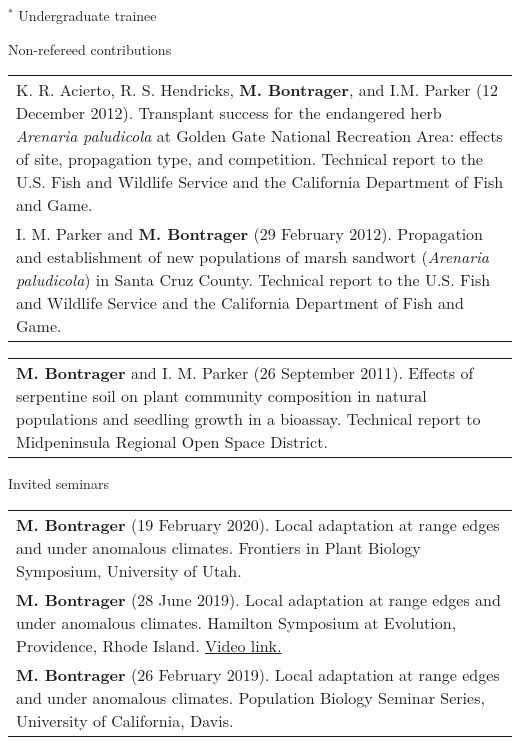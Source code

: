 \documentclass[letterpaper,11pt,oneside]{article}
\begin{document}
\smallskip
\noindent $^{*}$ Undergraduate trainee

\bigskip
\bigskip




\noindent\Large{Non-refereed contributions}  
\normalsize
\bigskip

\def\arraystretch{1.2}
\noindent \begin{tabular}{@{} >{\raggedright\arraybackslash}p{16.11cm}}
K. R. Acierto, R. S. Hendricks, \textbf{M. Bontrager}, and I.M. Parker (12 December 2012). Transplant success for the endangered herb \textit{Arenaria paludicola} at Golden Gate National Recreation Area: effects of site, propagation type, and competition. Technical report to the U.S. Fish and Wildlife Service and the California Department of Fish and Game. \\
I. M. Parker and \textbf{M. Bontrager} (29 February 2012). Propagation and establishment of new populations of marsh sandwort (\textit{Arenaria paludicola}) in Santa Cruz County. Technical report to the U.S. Fish and Wildlife Service and the California Department of Fish and Game. \\
\end{tabular}

\def\arraystretch{1.2}
\noindent \begin{tabular}{@{} >{\raggedright\arraybackslash}p{16.11cm}}
\textbf{M. Bontrager} and I. M. Parker (26 September 2011). Effects of serpentine soil on plant community composition in natural populations and seedling growth in a bioassay. Technical report to Midpeninsula Regional Open Space District. \\
\end{tabular}

\bigskip
\bigskip




\noindent\Large{Invited seminars}  
\normalsize
\bigskip

\def\arraystretch{1.2}
\noindent \begin{tabular}{@{} >{\raggedright\arraybackslash}p{16.51cm}}
\textbf{M. Bontrager} (19 February 2020). Local adaptation at range edges and under anomalous climates. Frontiers in Plant Biology Symposium, University of Utah.\\
\textbf{M. Bontrager} (28 June 2019). Local adaptation at range edges and under anomalous climates. Hamilton Symposium at Evolution, Providence, Rhode Island. \href{https://www.youtube.com/watch?v=UeK_zYEfVyA}{Video link.} \\
\textbf{M. Bontrager} (26 February 2019). Local adaptation at range edges and under anomalous climates. Population Biology Seminar Series, University of California, Davis. \\
\end{tabular}
\bigskip
\bigskip
\end{document}
